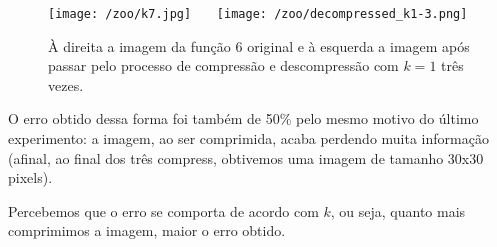 \documentclass{article}
\begin{document}
		\begin{figure}[H]
			\centering
			\captionsetup{justification=centering}
			\texttt{[image: /zoo/k7.jpg]} \ \ \
			\texttt{[image: /zoo/decompressed\_k1-3.png]} \\
			\caption{À direita a imagem da função 6 original e à esquerda a imagem após passar pelo processo de compressão e descompressão com $k = 1$ três vezes.}  
		\end{figure}\par
		O erro obtido dessa forma foi também de 50\% pelo mesmo motivo do último experimento: a imagem, ao ser comprimida, acaba perdendo muita informação (afinal, ao final dos três compress, obtivemos uma imagem de tamanho 30x30 pixels). \par
		Percebemos que o erro se comporta de acordo com $k$, ou seja, quanto mais comprimimos a imagem, maior o erro obtido. 
		
\end{document}
